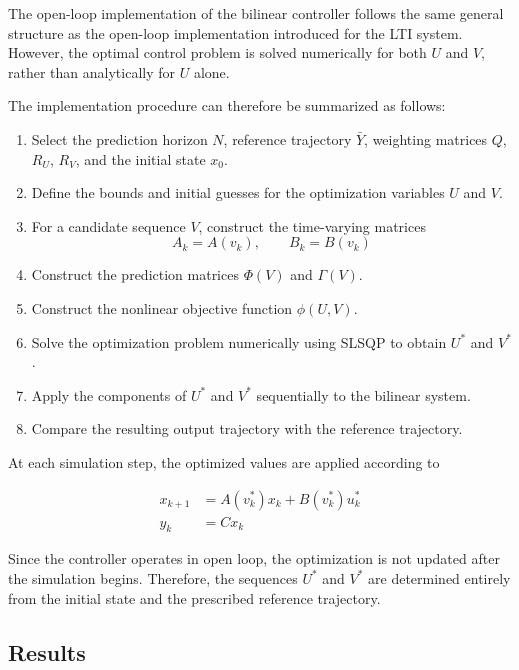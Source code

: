 The open-loop implementation of the bilinear controller follows the same general structure as the open-loop implementation introduced for the LTI system. However, the optimal control problem is solved numerically for both \(U\) and \(V\), rather than analytically for \(U\) alone.

The implementation procedure can therefore be summarized as follows:

\begin{enumerate}
    \item Select the prediction horizon \(N\), reference trajectory \(\bar{Y}\), weighting matrices \(Q\), \(R_U\), \(R_V\), and the initial state \(x_0\).
    \item Define the bounds and initial guesses for the optimization variables \(U\) and \(V\).
    \item For a candidate sequence \(V\), construct the time-varying matrices
    \[
        A_k=A(v_k),
        \qquad
        B_k=B(v_k)
    \]
    \item Construct the prediction matrices \(\Phi(V)\) and \(\Gamma(V)\).
    \item Construct the nonlinear objective function \(\phi(U,V)\).
    \item Solve the optimization problem numerically using SLSQP to obtain \(U^\ast\) and \(V^\ast\).
    \item Apply the components of \(U^\ast\) and \(V^\ast\) sequentially to the bilinear system.
    \item Compare the resulting output trajectory with the reference trajectory.
\end{enumerate}

At each simulation step, the optimized values are applied according to

\begin{align}
    x_{k+1}
    &=
    A(v_k^\ast)x_k
    +
    B(v_k^\ast)u_k^\ast \\
    y_k
    &=
    Cx_k
\end{align}

Since the controller operates in open loop, the optimization is not updated after the simulation begins. Therefore, the sequences \(U^\ast\) and \(V^\ast\) are determined entirely from the initial state and the prescribed reference trajectory.

\subsection{Results}
\label{subsec:bilinear_open_loop_results}

